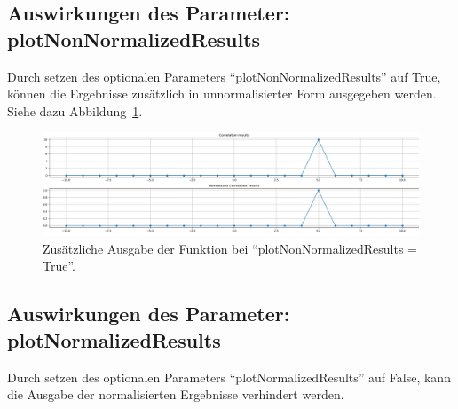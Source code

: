 \subsection{Auswirkungen des Parameter: plotNonNormalizedResults}
Durch setzen des optionalen Parameters \enquote{plotNonNormalizedResults} auf True, können die Ergebnisse zusätzlich in unnormalisierter Form ausgegeben werden.
Siehe dazu Abbildung~\ref{fig:correlationPlotNonNormalizedResults}. 
\begin{figure}[H]
    \includegraphics[width=\linewidth]{pythonImplementation/images/correlationPlotNonNormalizedResults.PNG}
    \caption[Ergebnis: plotNonNormalizedResults]{Zusätzliche Ausgabe der Funktion bei \enquote{plotNonNormalizedResults = True}\footnotemark. }
    \label{fig:correlationPlotNonNormalizedResults}
\end{figure}

\subsection{Auswirkungen des Parameter: plotNormalizedResults}
Durch setzen des optionalen Parameters \enquote{plotNormalizedResults} auf False, kann die Ausgabe der normalisierten Ergebnisse verhindert werden.

